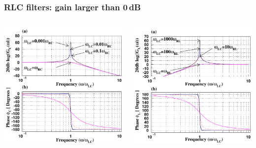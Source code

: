 \documentclass[beamer]{standalone}
\begin{document}
\begin{frame}
 \frametitle{RLC filters: gain larger than 0\,dB}
 \begin{columns}
  \begin{column}{0.5\textwidth}
   \includegraphics[width=\textwidth]{pics/RLC_bode_capacitor}   
  \end{column}
  \begin{column}{0.5\textwidth}
   \includegraphics[width=\textwidth]{pics/RLC_bode_inductor}

\end{column}
\end{columns}
\end{frame}
\end{document}
